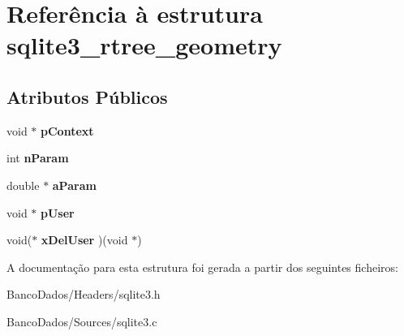 \hypertarget{structsqlite3__rtree__geometry}{\section{Referência à estrutura sqlite3\-\_\-rtree\-\_\-geometry}
\label{structsqlite3__rtree__geometry}
}
\subsection*{Atributos Públicos}
\begin{DoxyCompactItemize}
\item 
\hypertarget{structsqlite3__rtree__geometry_a33f98691626846c1317419654d5c5f51}{void $\ast$ {\bfseries p\-Context}}\label{structsqlite3__rtree__geometry_a33f98691626846c1317419654d5c5f51}

\item 
\hypertarget{structsqlite3__rtree__geometry_ada7b9eba82660e3321dd4c93526697c9}{int {\bfseries n\-Param}}\label{structsqlite3__rtree__geometry_ada7b9eba82660e3321dd4c93526697c9}

\item 
\hypertarget{structsqlite3__rtree__geometry_aa23f6565e6fee2416444333a75716057}{double $\ast$ {\bfseries a\-Param}}\label{structsqlite3__rtree__geometry_aa23f6565e6fee2416444333a75716057}

\item 
\hypertarget{structsqlite3__rtree__geometry_a6fdedfd741cf5055f9562298cd32dc74}{void $\ast$ {\bfseries p\-User}}\label{structsqlite3__rtree__geometry_a6fdedfd741cf5055f9562298cd32dc74}

\item 
\hypertarget{structsqlite3__rtree__geometry_afa1ed10f488b306df354efe56efdf287}{void($\ast$ {\bfseries x\-Del\-User} )(void $\ast$)}\label{structsqlite3__rtree__geometry_afa1ed10f488b306df354efe56efdf287}

\end{DoxyCompactItemize}


A documentação para esta estrutura foi gerada a partir dos seguintes ficheiros\-:\begin{DoxyCompactItemize}
\item 
Banco\-Dados/\-Headers/sqlite3.\-h\item 
Banco\-Dados/\-Sources/sqlite3.\-c\end{DoxyCompactItemize}
